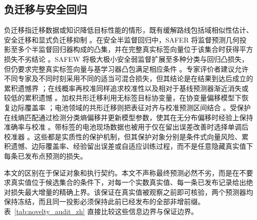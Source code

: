 \documentclass[UTF8,11pt]{ctexart}
\begin{document}
\subsection{负迁移与安全回归}

负迁移指迁移数据或知识降低目标性能的情形，既有缓解路线包括域相似性估计、安全迁移和显式负迁移抑制 \citep{zhang2023negative}。在安全半监督回归中，SAFER 将监督预测几何投影至多个半监督回归器构成的凸集，并在完整真实标签向量位于该集合时获得平方损失不劣结论 \citep{li2017safer}。SAFEW 将极大极小安全弱监督扩展至多种分类与回归凸损失，但仍要求完整真实标签向量与基学习器凸包满足相应条件 \citep{li2021safeweak}。专家评价者建议允许不同专家及不同时刻采用不同的适当可混合损失，但其结论是在结果到达后成立的累积遗憾界 \citep{chernov2009evaluators}；在线概率再校准同样追求校准性以及相对于基线预测器渐近消失或较低的累积遗憾 \citep{marx2025calibrated,deshpande2025calibrated}。加权共形迁移利用无标签目标协变量，在协变量偏移模型下恢复边际覆盖率 \citep{tuwani2023transport}；电池领域的共形迁移则把表征对齐与校准预测区间结合 \citep{filgueira2026conformalized}。受保护在线熵匹配通过检测分类熵偏移并更新模型参数，使其在无分布偏移时经验上保持准确率与校准 \citep{bar2024protected}。带标签的电池现场数据也被用于仅在留出误差改善时选择单调后校准器 \citep{nyachionjeka2026safecalibrated}。这些都是实质性的保护机制，但其保护对象分别是条件式向量风险、累积遗憾、边际覆盖率、经验留出误差或自适应训练过程，而不是任意隐藏真实值下每条已发布点预测的损失。

本文的区别在于保证对象和执行契约。本文不声称最终预测必然不劣，而是在不要求真实值位于候选集合的条件下，对每一个实数真实值、每一条已发布记录给出绝对损失最大增量的精确上界。该保证在真实值被观察之前即可核验，两个预测器均保持冻结，而且同一投影必须保持此前已经发布的全部非增前缀。表~\ref{tab:novelty_audit_zh} 直接比较这些信息边界与保证边界。
\end{document}
